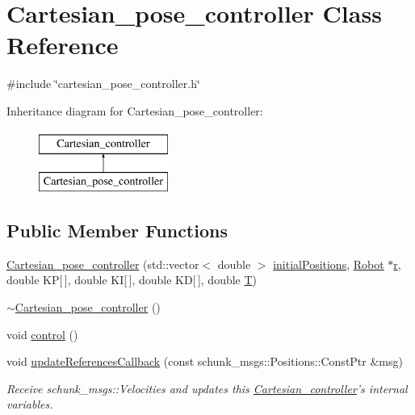 \hypertarget{classCartesian__pose__controller}{\section{Cartesian\-\_\-pose\-\_\-controller Class Reference}
\label{classCartesian__pose__controller}
}


{\ttfamily \#include \char`\"{}cartesian\-\_\-pose\-\_\-controller.\-h\char`\"{}}

Inheritance diagram for Cartesian\-\_\-pose\-\_\-controller\-:\begin{figure}[H]
\begin{center}
\leavevmode
\includegraphics[height=2.000000cm]{classCartesian__pose__controller}
\end{center}
\end{figure}
\subsection*{Public Member Functions}
\begin{DoxyCompactItemize}
\item 
\hyperlink{classCartesian__pose__controller_ab33ba9d374ac39a6723b4c4507db12e8}{Cartesian\-\_\-pose\-\_\-controller} (std\-::vector$<$ double $>$ \hyperlink{classCartesian__pose__controller_a42433d7f2e4e03ccaac56e1f9a7a5027}{initial\-Positions}, \hyperlink{structRobot}{Robot} $\ast$\hyperlink{classCartesian__controller_a5562129951bd802e4ded77fc716c87a0}{r}, double K\-P\mbox{[}$\,$\mbox{]}, double K\-I\mbox{[}$\,$\mbox{]}, double K\-D\mbox{[}$\,$\mbox{]}, double \hyperlink{classCartesian__controller_a35c6ddbb9624878f2807ff644a33e832}{T})
\item 
\hyperlink{classCartesian__pose__controller_ab1339b9181d43b7560f9fc688dc4d047}{$\sim$\-Cartesian\-\_\-pose\-\_\-controller} ()
\item 
void \hyperlink{classCartesian__pose__controller_ab937d166862f2756eb3d08f37a0a090d}{control} ()
\item 
void \hyperlink{classCartesian__pose__controller_af9c1ec1f565375f50f8a15b16464f94d}{update\-References\-Callback} (const schunk\-\_\-msgs\-::\-Positions\-::\-Const\-Ptr \&msg)
\begin{DoxyCompactList}\small\item\em Receive schunk\-\_\-msgs\-::\-Velocities and updates this \hyperlink{classCartesian__controller}{Cartesian\-\_\-controller}'s internal variables. \end{DoxyCompactList}\end{DoxyCompactItemize}

